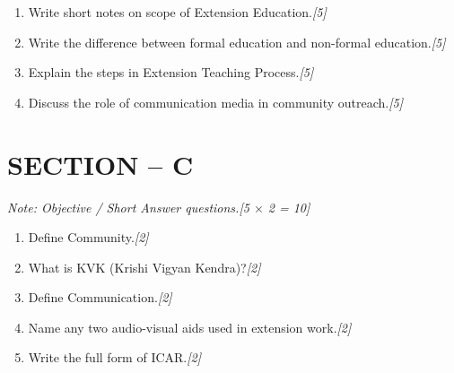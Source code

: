 \documentclass[11pt,a4paper]{article}
\newcommand{\pts}[1]{\hfill \textit{[#1]}}
\begin{document}
\begin{enumerate}[label=\textbf{\arabic*.},leftmargin=*,start=5,itemsep=8pt]

  \item Write short notes on scope of Extension Education.\pts{5}

  \item Write the difference between formal education and non-formal education.\pts{5}

  \item Explain the steps in Extension Teaching Process.\pts{5}

  \item Discuss the role of communication media in community outreach.\pts{5}

\end{enumerate}

\bigskip

\section*{SECTION -- C}
\noindent \textit{Note: Objective / Short Answer questions.}\pts{5 $\times$ 2 = 10}

\begin{enumerate}[label=\textbf{\arabic*.},leftmargin=*,start=9,itemsep=6pt]

  \item Define Community.\pts{2}

  \item What is KVK (Krishi Vigyan Kendra)?\pts{2}

  \item Define Communication.\pts{2}

  \item Name any two audio-visual aids used in extension work.\pts{2}

  \item Write the full form of ICAR.\pts{2}

\end{enumerate}
\end{document}
